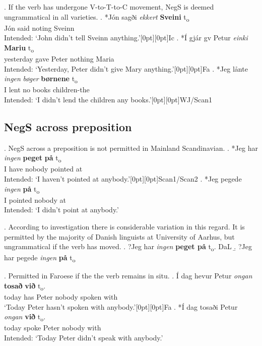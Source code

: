 \documentclass[12pt, letterpaper]{article}
\newcommand{\rcommentg}[1]{\hfill\raisebox{1.9\baselineskip}[0pt][0pt]{#1}} %
\begin{document}
\ex. If the verb has undergone V-to-T-to-C movement, NegS is deemed ungrammatical in all varieties.
\ag. *Jón sagði \textit{ekkert} \textbf{Sveini} t\textsubscript{o}\\
Jón said noting Sveinn\\
Intended: `John didn't tell Sveinn anything.'\rcommentg{Ic}
\bg. *{Í gjár} gv Petur \textit{einki} \textbf{Mariu} t\textsubscript{o}\\
yesterday gave Peter nothing Maria\\
Intended: `Yesterday, Peter didn't give Mary anything.'\rcommentg{Fa}
\cg. *Jeg lånte \textit{ingen} \textit{bøger} \textbf{børnene} t\textsubscript{o}\\
I lent no books children-the\\
Intended: `I didn't lend the children any books.'\rcommentg{WJ/Scan1}

\subsection{NegS across preposition}

\ex. NegS across a preposition is not permitted in Mainland Scandinavian.
\ag. *Jeg har \textit{ingen} \textbf{peget} \textbf{på} t\textsubscript{o} \\
I have nobody pointed at\\
Intended: `I haven't pointed at anybody.'\rcommentg{Scan1/Scan2}
\bg. *Jeg pegede \textit{ingen} \textbf{på} t\textsubscript{o}\\
I pointed nobody at\\
Intended: `I didn't point at anybody.'

\ex. According to  investigation there is considerable variation in this regard. It is permitted by the majority of Danish linguists at University of Aarhus, but ungrammatical if the verb has moved.
\a. ?Jeg har \textit{ingen} \textbf{peget på} t\textsubscript{o}. \hfill DaL
\b. ?Jeg har pegede \textit{ingen} \textbf{på} t\textsubscript{o}

\ex. Permitted in Faroese if the the verb remains in situ.
\ag. {Í dag} hevur Petur \textit{ongan} \textbf{tosað} \textbf{við} t\textsubscript{o}.\\
today has Peter nobody spoken with\\
`Today Peter hasn't spoken with anybody.'\rcommentg{Fa}
\bg. *{Í dag} tosaði Petur \textit{ongan} \textbf{við} t\textsubscript{o}.\\
today spoke Peter nobody with\\
Intended: `Today Peter didn't speak with anybody.'
\end{document}
